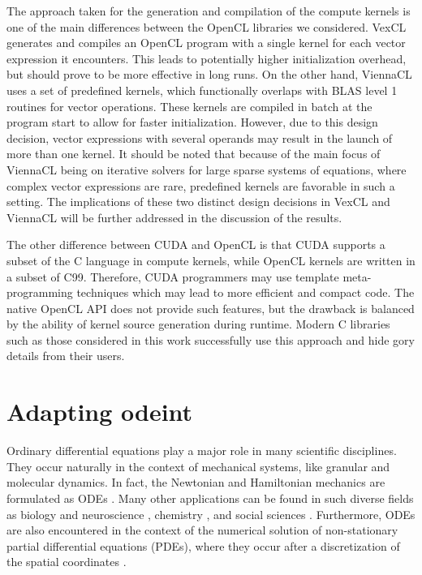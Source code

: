 \documentclass[final]{siamltex}
\newcommand{\addpp}[1]{{#1\nolinebreak[4]\hspace{-.05em}\raisebox{.4ex}{\tiny\bf ++}}\xspace}
\newcommand{\Cpp}{\addpp{C}}
\begin{document}
The approach taken for the generation and compilation of the compute kernels is
one of the main differences between the OpenCL libraries we considered.
VexCL generates and compiles an OpenCL
program with a single kernel for each vector expression it encounters.  This
leads to potentially higher initialization overhead, but should prove to be
more effective in long runs. On the other hand,
ViennaCL uses a set of predefined kernels, which functionally overlaps with
BLAS level 1 routines for vector operations. These kernels are compiled in
batch at the program start to allow for faster initialization. However, due to
this design decision, vector expressions with several operands may result in the launch
of more than one kernel. It should be noted that because of the main focus
of ViennaCL being on iterative solvers for large sparse systems of equations,
where complex vector expressions are rare, predefined kernels are favorable in
such a setting.  The implications of these two distinct design decisions in
VexCL and ViennaCL will be further addressed in the discussion of the results.

The other difference between CUDA and OpenCL is that CUDA supports a subset of
the \Cpp language in compute kernels, while OpenCL kernels are written in a subset
of C99. Therefore, CUDA programmers may use template meta-programming techniques
which may lead to more efficient and compact code. The native OpenCL API does
not provide such features, but the drawback is balanced by the ability of
kernel source generation during runtime. Modern \Cpp libraries such as those
considered in this work successfully use this approach and hide gory details
from their users.




%
%
\section{Adapting odeint} \label{sec:adapting-odeint}

Ordinary differential equations play a major role in many scientific
disciplines. They occur naturally in the context of mechanical systems, like
granular \cite{poschel_computational_2005} and molecular dynamics. In fact, the  %
Newtonian and Hamiltonian mechanics are formulated as ODEs
\cite{landau_mechanics_1976}.  Many other applications can be found in such
diverse fields as biology \cite{brauer_mathematical_2001,Murray-93} and
neuroscience \cite{izhikevich_dynamical_2006}, chemistry
\cite{atkins_physical_2001}, and social sciences \cite{Helbing01}. Furthermore,
ODEs are also encountered in the context of the numerical solution of
non-stationary partial differential equations (PDEs), where they occur after
a discretization of the spatial coordinates \cite{Hundsdorfer2003}.
\end{document}
